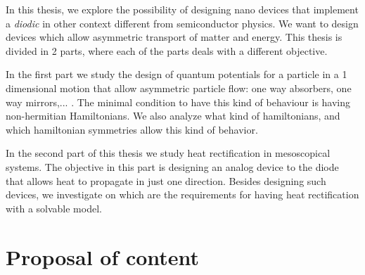 In this thesis, we explore the possibility of designing nano devices that implement a \textit{diodic} in other context different from semiconductor physics. We want to design devices which allow asymmetric transport of matter and energy. This thesis is divided in 2 parts, where each of the parts deals with a different objective.

In the first part we study the design of quantum potentials for a particle in a 1 dimensional motion that allow asymmetric particle flow: one way absorbers, one way mirrors,... . The minimal condition to have this kind of behaviour is having non-hermitian Hamiltonians. We also analyze what kind of hamiltonians, and which hamiltonian symmetries allow this kind of behavior.

In the second part of this thesis we study heat rectification in mesoscopical systems. The objective in this part is designing an analog device to the diode that allows heat to propagate in just one direction. Besides designing such devices, we investigate on which are the requirements for having heat rectification with a solvable model.




\section{Proposal of content}

